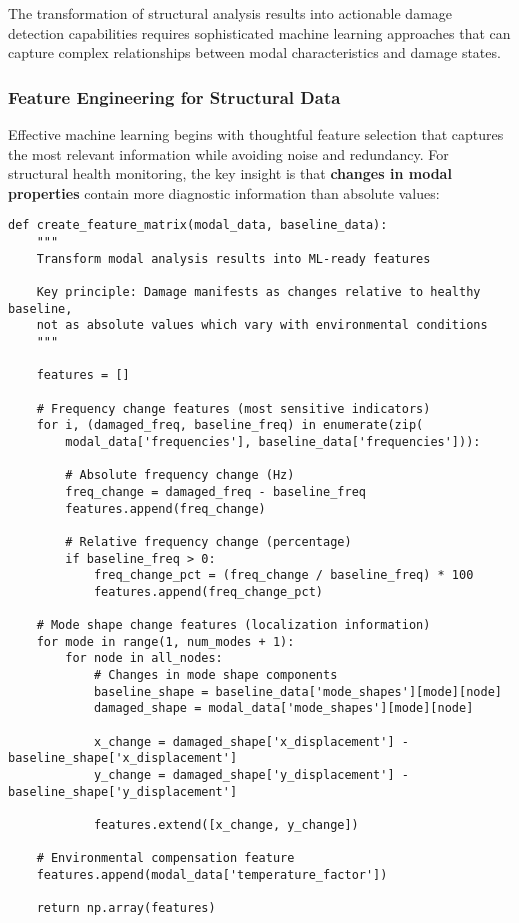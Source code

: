 \documentclass[11pt,a4paper]{article}
\begin{document}
The transformation of structural analysis results into actionable damage detection capabilities requires sophisticated machine learning approaches that can capture complex relationships between modal characteristics and damage states.

\subsubsection{Feature Engineering for Structural Data}

Effective machine learning begins with thoughtful feature selection that captures the most relevant information while avoiding noise and redundancy. For structural health monitoring, the key insight is that \textbf{changes in modal properties} contain more diagnostic information than absolute values:

\begin{lstlisting}[caption={Feature Matrix Creation for ML}]
def create_feature_matrix(modal_data, baseline_data):
    """
    Transform modal analysis results into ML-ready features
    
    Key principle: Damage manifests as changes relative to healthy baseline,
    not as absolute values which vary with environmental conditions
    """
    
    features = []
    
    # Frequency change features (most sensitive indicators)
    for i, (damaged_freq, baseline_freq) in enumerate(zip(
        modal_data['frequencies'], baseline_data['frequencies'])):
        
        # Absolute frequency change (Hz)
        freq_change = damaged_freq - baseline_freq
        features.append(freq_change)
        
        # Relative frequency change (percentage)
        if baseline_freq > 0:
            freq_change_pct = (freq_change / baseline_freq) * 100
            features.append(freq_change_pct)
    
    # Mode shape change features (localization information)
    for mode in range(1, num_modes + 1):
        for node in all_nodes:
            # Changes in mode shape components
            baseline_shape = baseline_data['mode_shapes'][mode][node]
            damaged_shape = modal_data['mode_shapes'][mode][node]
            
            x_change = damaged_shape['x_displacement'] - baseline_shape['x_displacement']
            y_change = damaged_shape['y_displacement'] - baseline_shape['y_displacement']
            
            features.extend([x_change, y_change])
    
    # Environmental compensation feature
    features.append(modal_data['temperature_factor'])
    
    return np.array(features)
\end{lstlisting}
\end{document}
